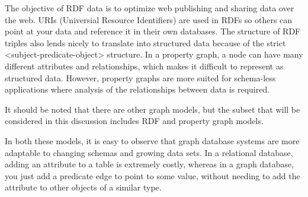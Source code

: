 The objective of RDF data is to optimize web publishing and sharing data over the web. URIs (Universial Resource Identifiers) are used in RDFs so others can point at your data and reference it in their own databases. The structure of RDF triples also lends nicely to translate into structured data because of the strict <subject-predicate-object> structure. In a property graph, a node can have many different attributes and relationships, which makes it difficult to represent as structured data. However, property graphs are more suited for schema-less applications where analysis of the relationships between data is required.


It should be noted that there are other graph models, but the subset that will be considered in this discussion includes RDF and property graph models. 


In both these models, it is easy to observe that graph database systems are more adaptable to changing schemas and growing data sets. In a relational database, adding an attribute to a table is extremely costly, whereas in a graph database, you just add a predicate edge to point to some value, without needing to add the attribute to other objects of a similar type.






